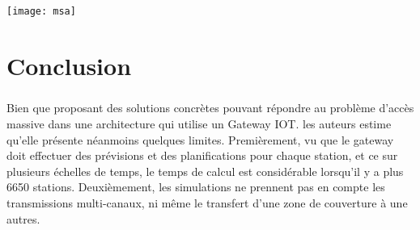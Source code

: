 \documentclass[12pt]{article}
\begin{document}
\texttt{[image: msa]}

\section{Conclusion}
\subparagraph{} Bien que proposant des solutions concrètes pouvant répondre au problème d'accès massive dans une architecture qui utilise un Gateway IOT.
les auteurs estime qu'elle présente néanmoins quelques limites. Premièrement,  vu que le gateway doit effectuer des prévisions et des planifications pour chaque station, et ce sur plusieurs échelles de temps, le temps de calcul est considérable lorsqu'il y a plus 6650 stations. Deuxièmement, les simulations ne prennent pas en compte les transmissions multi-canaux, ni même le transfert d'une zone de couverture à une autres.

\nocite{*}


\end{document}
